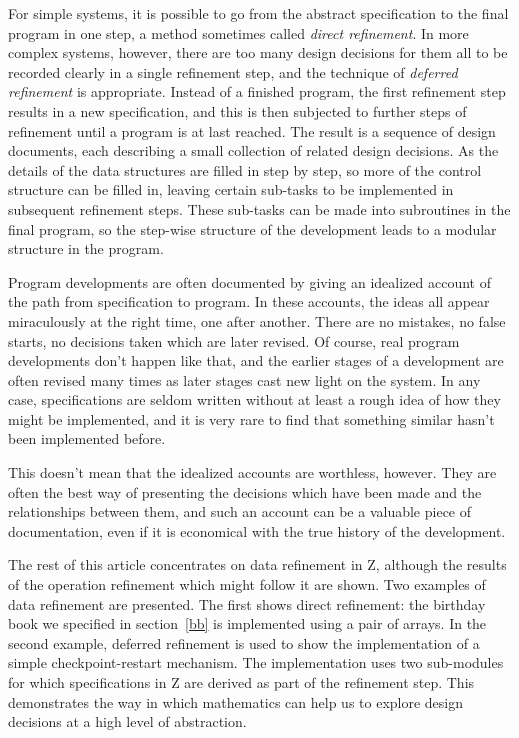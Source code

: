 \documentclass[12pt]{article}
\begin{document}
For simple systems, it is possible to go from the abstract specification
to the final program in one step, a method sometimes called {\em direct
refinement}. In more complex systems, however, there are too many design
decisions for them all to be recorded clearly in a single refinement step,
and the technique of {\em deferred refinement\/} is appropriate.
Instead of a finished program, the first refinement step results in a new
specification, and this is then subjected to further steps of refinement until
a program is at last reached. The result is a sequence of design documents,
each describing a small collection of related design decisions. As the
details of the data structures are filled in step by step, so more of the
control structure can be filled in, leaving certain sub-tasks to be
implemented in subsequent refinement steps. These sub-tasks can be made
into subroutines in the final program, so the step-wise structure of the
development leads to a modular structure in the program.

Program developments are often documented by giving an idealized
account of the path from specification to program. In these accounts,
the ideas all appear miraculously at the right time, one after
another. There are no mistakes, no false starts, no decisions taken
which are later revised. Of course, real program developments don't
happen like that, and the earlier stages of a development are often
revised many times as later stages cast new light on the system. In
any case, specifications are seldom written without at least a rough
idea of how they might be implemented, and it is very rare to find
that something similar hasn't been implemented before.

This doesn't mean that the idealized accounts are worthless, however.
They are often the best way of presenting the decisions which have been made
and the relationships between them, and such an account can be a valuable
piece of documentation, even if it is economical with the true history
of the development.

The rest of this article concentrates on data refinement in Z,
although the results of the operation refinement which might follow it
are shown.  Two examples of data refinement are presented.  The first
shows direct refinement: the birthday book we specified in
section~\ref{bb} is implemented using a pair of arrays. In the second
example, deferred refinement is used to show the implementation of a
simple checkpoint-restart mechanism.  The implementation uses two
sub-modules for which specifications in Z are derived as part of the
refinement step. This demonstrates the way in which mathematics can
help us to explore design decisions at a high level of abstraction.
\end{document}
